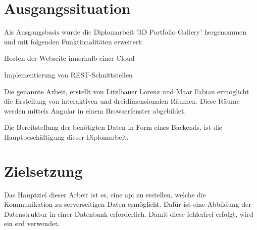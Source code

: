 \section{Ausgangssituation}
Als Ausgangsbasis wurde die Diplomarbeit '3D Portfolio Gallery' hergenommen und mit folgenden Funktionalitäten erweitert:

\begin{compactitem}
    \item Hosten der Webseite innerhalb einer Cloud
    \item Implementierung von REST-Schnittstellen 
\end{compactitem}

Die genannte Arbeit, erstellt von Litzlbauer Lorenz und Maar Fabian 
ermöglicht die Erstellung von interaktiven und dreidimensionalen Räumen.
Diese Räume werden mittels Angular in einem Browserfenster abgebildet.


Die Bereitstellung der benötigten Daten in Form eines Backends, ist die Hauptbeschäftigung dieser Diplomarbeit.

\section{Zielsetzung}

Das Hauptziel dieser Arbeit ist es, eine \Gls{api} zu erstellen, welche die Kommunikation zu serverseitigen Daten ermöglicht. 
Dafür ist eine Abbildung der Datenstruktur in einer Datenbank erforderlich. 
Damit diese fehlerfrei erfolgt, wird ein \Gls{erd} verwendet. 